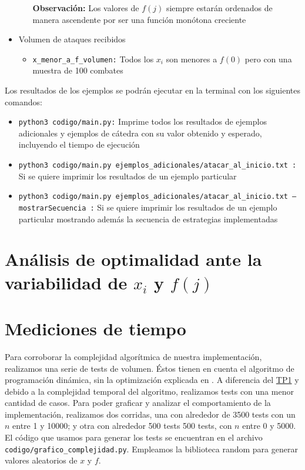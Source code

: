 \documentclass{article}
\begin{document}
\begin{itemize}
\begin{itemize}
        \textbf{Observación: }Los valores de $f(j)$ siempre estarán ordenados de manera ascendente por ser una función monótona creciente
    \end{itemize}
    \item Volumen de ataques recibidos
    \begin{itemize}
        \item \texttt{x\_menor\_a\_f\_volumen:} Todos los $x_i$ son menores a $f(0)$ pero con una muestra de 100 combates
    \end{itemize}
\end{itemize}

Los resultados de los ejemplos se podrán ejecutar en la terminal con los siguientes comandos:

\begin{itemize}
    \item \texttt{python3 codigo/main.py:} Imprime todos los resultados de ejemplos adicionales y ejemplos de cátedra con su valor obtenido y esperado, incluyendo el tiempo de ejecución
    \item \texttt{python3 codigo/main.py ejemplos\_adicionales/atacar\_al\_inicio.txt :} Si se quiere imprimir los resultados de un ejemplo particular
    \item \texttt{python3 codigo/main.py ejemplos\_adicionales/atacar\_al\_inicio.txt --mostrarSecuencia :} Si se quiere imprimir los resultados de un ejemplo particular mostrando además la secuencia de estrategias implementadas
\end{itemize}

\section{Análisis de optimalidad ante la variabilidad de $x_i$ y $f(j)$}

\section{Mediciones de tiempo}
\label{sec:medTiempo}
Para corroborar la complejidad algorítmica de nuestra implementación, realizamos una serie de tests de volumen. Éstos tienen en cuenta el algoritmo de programación dinámica, sin la optimización explicada en . A diferencia del \href{https://github.com/La-sociedad-del-silencio/TP1-Greedy}{TP1} y debido a la complejidad temporal del algoritmo, realizamos tests con una menor cantidad de casos.
Para poder graficar y analizar el comportamiento de la implementación, realizamos dos corridas, una con alrededor de 3500 tests con un $n$ entre  1 y 10000; y otra con alrededor 500 tests 500 tests, con $n$ entre 0 y 5000. El código que usamos para generar los tests se encuentran en el archivo \texttt{codigo/grafico\_complejidad.py}. Empleamos la biblioteca random para generar valores aleatorios de $x$ y $f$.
\end{document}
